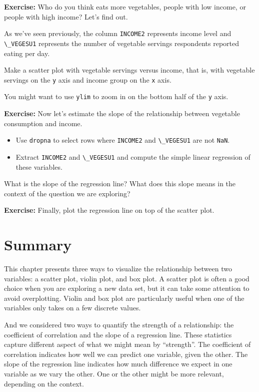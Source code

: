 \textbf{Exercise:} Who do you think eats more vegetables, people with
low income, or people with high income? Let's find out.

As we've seen previously, the column \passthrough{\lstinline!INCOME2!}
represents income level and \passthrough{\lstinline!\_VEGESU1!}
represents the number of vegetable servings respondents reported eating
per day.

Make a scatter plot with vegetable servings versus income, that is, with
vegetable servings on the \passthrough{\lstinline!y!} axis and income
group on the \passthrough{\lstinline!x!} axis.

You might want to use \passthrough{\lstinline!ylim!} to zoom in on the
bottom half of the \passthrough{\lstinline!y!} axis.

\textbf{Exercise:} Now let's estimate the slope of the relationship
between vegetable consumption and income.

\begin{itemize}
\item
  Use \passthrough{\lstinline!dropna!} to select rows where
  \passthrough{\lstinline!INCOME2!} and
  \passthrough{\lstinline!\_VEGESU1!} are not
  \passthrough{\lstinline!NaN!}.
\item
  Extract \passthrough{\lstinline!INCOME2!} and
  \passthrough{\lstinline!\_VEGESU1!} and compute the simple linear
  regression of these variables.
\end{itemize}

What is the slope of the regression line? What does this slope means in
the context of the question we are exploring?

\textbf{Exercise:} Finally, plot the regression line on top of the
scatter plot.

\hypertarget{summary}{%
\section{Summary}\label{summary}}

This chapter presents three ways to visualize the relationship between
two variables: a scatter plot, violin plot, and box plot. A scatter plot
is often a good choice when you are exploring a new data set, but it can
take some attention to avoid overplotting. Violin and box plot are
particularly useful when one of the variables only takes on a few
discrete values.

And we considered two ways to quantify the strength of a relationship:
the coefficient of correlation and the slope of a regression line. These
statistics capture different aspect of what we might mean by
``strength''. The coefficient of correlation indicates how well we can
predict one variable, given the other. The slope of the regression line
indicates how much difference we expect in one variable as we vary the
other. One or the other might be more relevant, depending on the
context.

